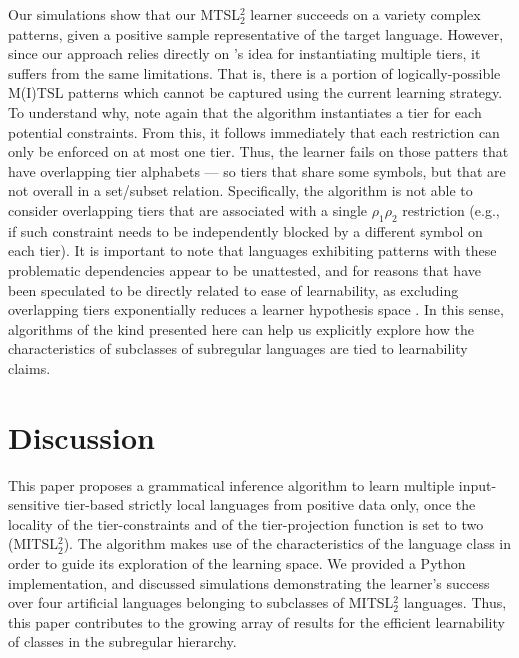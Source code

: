 \documentclass[11pt,a4paper]{article}
\begin{document}
Our simulations show that our MTSL$^2_2$  learner succeeds on a variety complex patterns, given a positive sample representative of the target language.
However, since our approach relies directly on  \citet{McMullinSCIL2019}'s idea for instantiating multiple tiers, it suffers from the same limitations.
That is,  there is a portion of logically-possible M(I)TSL patterns which cannot be captured using the current learning strategy.
To understand why, note again that the algorithm instantiates a tier for each potential constraints.
From this, it follows immediately that  each restriction can only be enforced on at most one tier. 
Thus, the learner fails on those patters that have overlapping tier alphabets --- so tiers that share some symbols, but that are not overall in a set/subset relation.
Specifically, the algorithm is not able to consider overlapping tiers that are associated with a single \text{*}$\rho_1\rho_2$ restriction (e.g., if such constraint needs to be independently blocked by a different symbol on each tier).
It is important to note that languages exhibiting patterns with these problematic dependencies appear to be unattested, and for reasons that have been speculated to be directly related to ease of learnability, as excluding overlapping tiers exponentially reduces a learner hypothesis space \citep{aksenova2018formal}.
In this sense, algorithms of the kind presented here can help us  explicitly explore how the characteristics of subclasses of subregular languages are tied to learnability claims.

\section{Discussion}

 This paper proposes a grammatical  inference algorithm to learn multiple input-sensitive tier-based strictly local languages \citep[MITSL;][]{desanto2019structure} from positive data only, once the locality of the tier-constraints and of the tier-projection function is set to two (MITSL$^2_2$).
The algorithm makes use of the characteristics of the language class in order to guide its exploration of the learning space.
We provided a Python implementation, and discussed simulations demonstrating the learner's success over four artificial languages belonging to subclasses of MITSL$^2_2$ languages.
Thus, this paper contributes to the growing array of results for the efficient learnability of classes in the subregular hierarchy.
\end{document}
